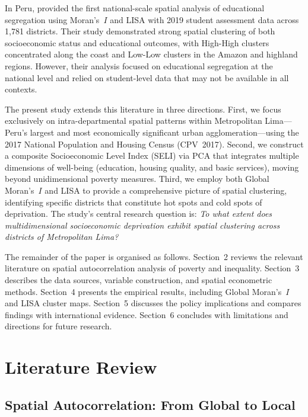 \documentclass[12pt,a4paper,twoside]{article}
\begin{document}
In Peru, \citet{alonso2025segregacion} provided the first national-scale spatial
analysis of educational segregation using Moran's~$I$ and LISA with 2019 student
assessment data across 1,781 districts. Their study demonstrated strong spatial
clustering of both socioeconomic status and educational outcomes, with High-High
clusters concentrated along the coast and Low-Low clusters in the Amazon and
highland regions. However, their analysis focused on educational segregation at
the national level and relied on student-level data that may not be available in
all contexts.

The present study extends this literature in three directions. First, we focus
exclusively on intra-departmental spatial patterns within Metropolitan Lima---Peru's
largest and most economically significant urban agglomeration---using the 2017
National Population and Housing Census (CPV~2017). Second, we construct a composite
Socioeconomic Level Index (SELI) via PCA that integrates multiple dimensions of
well-being (education, housing quality, and basic services), moving beyond
unidimensional poverty measures. Third, we employ both Global Moran's~$I$ and LISA
to provide a comprehensive picture of spatial clustering, identifying specific
districts that constitute hot spots and cold spots of deprivation. The study's
central research question is: \textit{To what extent does multidimensional
socioeconomic deprivation exhibit spatial clustering across districts of
Metropolitan Lima?}

The remainder of the paper is organised as follows. Section~2 reviews the relevant
literature on spatial autocorrelation analysis of poverty and inequality. Section~3
describes the data sources, variable construction, and spatial econometric methods.
Section~4 presents the empirical results, including Global Moran's~$I$ and LISA
cluster maps. Section~5 discusses the policy implications and compares findings
with international evidence. Section~6 concludes with limitations and directions
for future research.

\section{Literature Review}

\subsection{Spatial Autocorrelation: From Global to Local}
\end{document}
